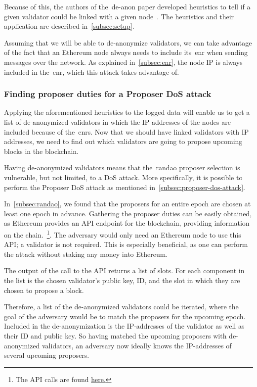 Because of this,
the authors of the~\gls{de-anon paper} developed heuristics to tell if a given validator could be linked with a given node~\cite{heimbach2024deanonymizingethereumvalidatorsp2p}.
The heuristics and their application are described in~\autoref{subsec:setup}.

Assuming that we will be able to de-anonymize validators, we can take advantage of the fact that an Ethereum node always needs to include its~\gls{enr} when sending messages over the network.
As explained in~\autoref{subsec:enr}, the node IP is always included in the~\gls{enr}, which this attack takes advantage of.

\subsubsection{Finding proposer duties for a Proposer DoS attack}
Applying the aforementioned heuristics to the logged data will enable us to get a list of de-anonymized validators in which the IP addresses of the nodes are included because of the~\glspl{enr}.
Now that we should have linked validators with IP addresses, we need to find out which validators are going to propose upcoming blocks in the blockchain.

Having de-anonymized validators means that the~\gls{randao} proposer selection is vulnerable,
but not limited, to a DoS attack.
More specifically,
it is possible to perform the Proposer DoS attack as mentioned in~\autoref{subsec:proposer-dos-attack}.

In~\autoref{subsec:randao}, we found that the proposers for an entire epoch are chosen at least one epoch in advance.
Gathering the proposer duties can be easily obtained, as Ethereum provides an API endpoint for the blockchain,
providing information on the chain.~\footnote{The API calls are found \href{https://ethereum.github.io/beacon-APIs/\#/Validator/getProposerDuties}{here.}}.
The adversary would only need an Ethereum node to use this API; a validator is not required.
This is especially beneficial, as one can perform the attack without staking any money into Ethereum.

The output of the call to the API returns a list of slots.
For each component in the list is the chosen validator's public key,
ID, and the slot in which they are chosen to propose a block.

Therefore, a list of the de-anonymized validators could be iterated,
where the goal of the adversary would be to match the proposers for the upcoming epoch.
Included in the de-anonymization is the IP-addresses of the validator as well as their ID and public key.
So having matched the upcoming proposers with de-anonymized validators,
an adversary now ideally knows the IP-addresses of several upcoming proposers.

